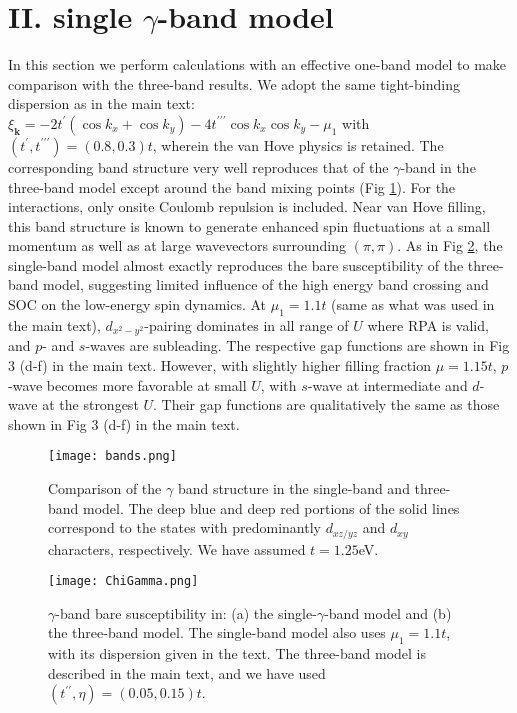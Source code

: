 \documentclass[aps,prl,twocolumn,superscriptaddress,showpacs]{revtex4-1}
\newcommand{\bs}{\boldsymbol}
\begin{document}
\section{II. single $\gamma$-band model}
In this section we perform calculations with an effective one-band model to make comparison with the three-band results. We adopt the same tight-binding dispersion as in the main text: $\xi_{\bs k}= -2t^\prime (\cos k_x + \cos k_y) - 4t^{\prime\prime\prime} \cos k_x \cos k_y -\mu_1$ with $(t^\prime,t^{\prime\prime\prime})=(0.8,0.3)t$, wherein the van Hove physics is retained. The corresponding band structure very well reproduces that of the $\gamma$-band in the three-band model except around the band mixing points (Fig \ref{fig:Bands}). For the interactions, only onsite Coulomb repulsion is included. Near van Hove filling, this band structure is known to generate enhanced spin fluctuations at a small momentum as well as at large wavevectors surrounding $(\pi,\pi)$. As in Fig \ref{fig:ChiGamma}, the single-band model almost exactly reproduces the bare susceptibility of the three-band model, suggesting limited influence of the high energy band crossing and SOC on the low-energy spin dynamics. At $\mu_1=1.1t$ (same as what was used in the main text), $d_{x^2-y^2}$-pairing dominates in all range of $U$ where RPA is valid, and $p$- and $s$-waves are subleading. The respective gap functions are shown in Fig 3 (d-f) in the main text. However, with slightly higher filling fraction $\mu=1.15t$, $p$-wave becomes more favorable at small $U$, with $s$-wave at intermediate and $d$-wave at the strongest $U$. Their gap functions are qualitatively the same as those shown in Fig 3 (d-f) in the main text.

\begin{figure}
\texttt{[image: bands.png]}
\caption{Comparison of the $\gamma$ band structure in the single-band and three-band model. The deep blue and deep red portions of the solid lines correspond to the states with predominantly $d_{xz/yz}$ and $d_{xy}$ characters, respectively. We have assumed $t=1.25$eV.}
\label{fig:Bands}
\end{figure}

\begin{figure}
\texttt{[image: ChiGamma.png]}
\caption{$\gamma$-band bare susceptibility in: (a) the single-$\gamma$-band model and (b) the three-band model. The single-band model also uses $\mu_1=1.1t$, with its dispersion given in the text. The three-band model is described in the main text, and we have used $(t^{\prime\prime},\eta)=(0.05,0.15)t$. }
\label{fig:ChiGamma}
\end{figure}
\end{document}
